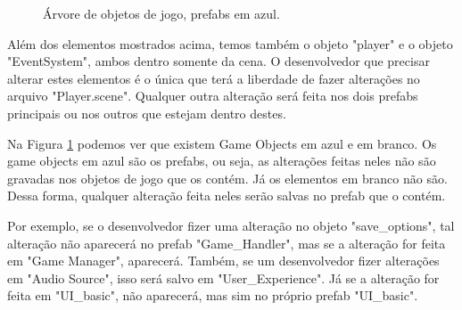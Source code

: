 \begin{figure}[h]
\begin{center}
        \end{center}
        \caption{Árvore de objetos de jogo, prefabs em azul.}
        \label{fig:gameo}
    \end{figure}

    Além dos elementos mostrados acima, temos também o objeto "player" e o objeto "EventSystem", ambos dentro somente da cena.
    O desenvolvedor que precisar alterar estes elementos é o única que terá a liberdade de fazer alterações no arquivo "Player.scene".
    Qualquer outra alteração será feita nos dois prefabs principais ou nos outros que estejam dentro destes.

    Na Figura \ref{fig:gameo} podemos ver que existem Game Objects em azul e em branco.
    Os game objects em azul são os prefabs, ou seja, as alterações feitas neles não são gravadas nos objetos de jogo que os contém.
    Já os elementos em branco não são.
    Dessa forma, qualquer alteração feita neles serão salvas no prefab que o contém.

    Por exemplo, se o desenvolvedor fizer uma alteração no objeto "save\_options", tal alteração não aparecerá no prefab "Game\_Handler", mas se a alteração for feita em "Game Manager", aparecerá.
    Também, se um desenvolvedor fizer alterações em "Audio Source", isso será salvo em "User\_Experience". Já se a alteração for feita em "UI\_basic", não aparecerá, mas sim no próprio prefab "UI\_basic".

